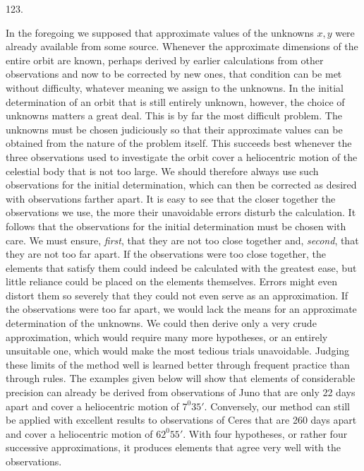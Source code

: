 \par{}\medskip
\begin{center}\hypertarget{native-170-article123}{}123.\end{center}
In the foregoing we supposed that approximate values of the unknowns $x,y$ were already available from some source. Whenever the approximate dimensions of the entire orbit are known, perhaps derived by earlier calculations from other observations and now to be corrected by new ones, that condition can be met without difficulty, whatever meaning we assign to the unknowns. In the initial determination of an orbit that is still entirely unknown, however, the choice of unknowns matters a great deal. This is by far the most difficult problem. The unknowns must be chosen judiciously so that their approximate values can be obtained from the nature of the problem itself. This succeeds best whenever the three observations used to investigate the orbit cover a heliocentric motion of the celestial body that is not too large. We should therefore always use such observations for the initial determination, which can then be corrected as desired with observations farther apart. It is easy to see that the closer together the observations we use, the more their unavoidable errors disturb the calculation. It follows that the observations for the initial determination must be chosen with care. We must ensure, \emph{first}, that they are not too close together and, \emph{second}, that they are not too far apart. If the observations were too close together, the elements that satisfy them could indeed be calculated with the greatest ease, but little reliance could be placed on the elements themselves. Errors might even distort them so severely that they could not even serve as an approximation. If the observations were too far apart, we would lack the means for an approximate determination of the unknowns. We could then derive only a very crude approximation, which would require many more hypotheses, or an entirely unsuitable one, which would make the most tedious trials unavoidable. Judging these limits of the method well is learned better through frequent practice than through rules. The examples given below will show that elements of considerable precision can already be derived from observations of Juno that are only 22 days apart and cover a heliocentric motion of $7^0 35'$. Conversely, our method can still be applied with excellent results to observations of Ceres that are 260 days apart and cover a heliocentric motion of $62^0 55'$. With four hypotheses, or rather four successive approximations, it produces elements that agree very well with the observations.
